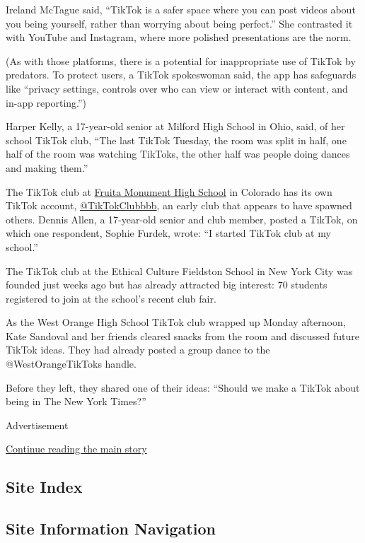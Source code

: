 Ireland McTague said, ``TikTok is a safer space where you can post
videos about you being yourself, rather than worrying about being
perfect.'' She contrasted it with YouTube and Instagram, where more
polished presentations are the norm.

(As with those platforms, there is a potential for inappropriate use of
TikTok by predators. To protect users, a TikTok spokeswoman said, the
app has safeguards like ``privacy settings, controls over who can view
or interact with content, and in-app reporting.'')

Harper Kelly, a 17-year-old senior at Milford High School in Ohio, said,
of her school TikTok club, ``The last TikTok Tuesday, the room was split
in half, one half of the room was watching TikToks, the other half was
people doing dances and making them.''

The TikTok club at
\href{https://fruitanews.org/2634/stories/tiktok-craze-rising/}{Fruita
Monument High School} in Colorado has its own TikTok account,
\href{http://vm.tiktok.com/5qwaEj/}{@TikTokClubbbb}, an early club that
appears to have spawned others. Dennis Allen, a 17-year-old senior and
club member, posted a TikTok, on which one respondent, Sophie Furdek,
wrote: ``I started TikTok club at my school.''

The TikTok club at the Ethical Culture Fieldston School in New York City
was founded just weeks ago but has already attracted big interest: 70
students registered to join at the school's recent club fair.

As the West Orange High School TikTok club wrapped up Monday afternoon,
Kate Sandoval and her friends cleared snacks from the room and discussed
future TikTok ideas. They had already posted a group dance to the
@WestOrangeTikToks handle.

Before they left, they shared one of their ideas: ``Should we make a
TikTok about being in The New York Times?''

Advertisement

\protect\hyperlink{after-bottom}{Continue reading the main story}

\hypertarget{site-index}{%
\subsection{Site Index}\label{site-index}}

\hypertarget{site-information-navigation}{%
\subsection{Site Information
Navigation}\label{site-information-navigation}}

